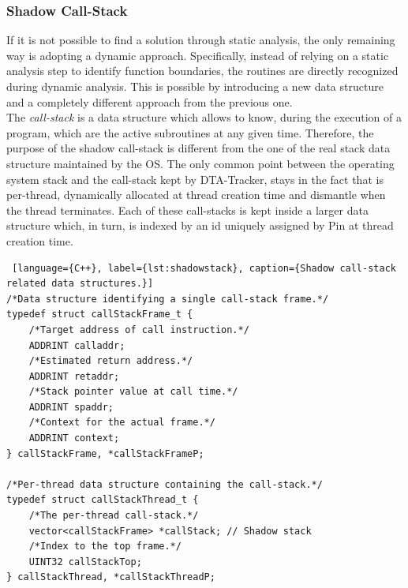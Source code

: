 \documentclass[LaM,binding=0.6cm]{sapthesis}
\begin{document}
\subsubsection{Shadow Call-Stack}
If it is not possible to find a solution through static analysis, the only remaining way is adopting a dynamic approach. Specifically, instead of relying on a static analysis step to identify function boundaries, the routines are directly recognized during dynamic analysis. This is possible by introducing a new data structure and a completely different approach from the previous one.\\

The \textit{call-stack} is a data structure which allows to know, during the execution of a program, which are the active subroutines at any given time\cite{de2018now}. Therefore, the purpose of the shadow call-stack is different from the one of the real stack data structure maintained by the OS. The only common point between the operating system stack and the call-stack kept by DTA-Tracker, stays in the fact that is per-thread, dynamically allocated at thread creation time and dismantle when the thread terminates. Each of these call-stacks is kept inside a larger data structure which, in turn, is indexed by an id uniquely assigned by Pin at thread creation time.

\begin{lstlisting} [language={C++}, label={lst:shadowstack}, caption={Shadow call-stack related data structures.}]
/*Data structure identifying a single call-stack frame.*/
typedef struct callStackFrame_t {
	/*Target address of call instruction.*/
	ADDRINT calladdr; 
	/*Estimated return address.*/
	ADDRINT retaddr;
	/*Stack pointer value at call time.*/
	ADDRINT spaddr;
	/*Context for the actual frame.*/
	ADDRINT context;
} callStackFrame, *callStackFrameP;

/*Per-thread data structure containing the call-stack.*/
typedef struct callStackThread_t {
	/*The per-thread call-stack.*/
	vector<callStackFrame> *callStack; // Shadow stack
	/*Index to the top frame.*/
	UINT32 callStackTop;
} callStackThread, *callStackThreadP;
\end{lstlisting}
\end{document}
